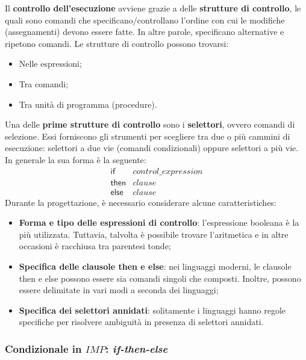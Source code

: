 \documentclass[a4paper]{article}
\begin{document}
 	Il \textbf{controllo dell'esecuzione} avviene grazie a delle \textbf{strutture di controllo}, le quali sono comandi che specificano/controllano l'ordine con cui le modifiche (assegnamenti) devono essere fatte. In altre parole, specificano alternative e ripetono comandi. Le strutture di controllo possono trovarsi:
 	\begin{itemize}
 		\item Nelle espressioni;
 		\item Tra comandi;
 		\item Tra unità di programma (procedure).
 	\end{itemize}
 	Una delle \textbf{prime strutture di controllo} sono i \textcolor{Red3}{\textbf{selettori}}, ovvero comandi di selezione. Essi forniscono gli strumenti per scegliere tra due o più cammini di esecuzione: selettori a due vie (comandi condizionali) oppure selettori a più vie. In generale la sua forma è la seguente:
 	\begin{equation*}
 		\begin{array}{ll}
 			\mathsf{if} 	& control\_expression \\
 			\mathsf{then}	& clause \\
 			\mathsf{else}	& clause
 		\end{array}
 	\end{equation*}
 	Durante la progettazione, è necessario considerare alcune caratteristiches:
 	\begin{itemize}
 		\item \textbf{Forma e tipo delle espressioni di controllo}: l'espressione booleana è la più utilizzata. Tuttavia, talvolta è possibile trovare l'aritmetica e in altre occasioni è racchiusa tra parentesi tonde;
 		
 		\item \textbf{Specifica delle clausole \textsf{then} e \textsf{else}}: nei linguaggi moderni, le clausole \textsf{then} e \textsf{else} possono essere sia comandi singoli che composti. Inoltre, possono essere delimitate in vari modi a seconda dei linguaggi;
 		
 		\item \textbf{Specifica dei selettori annidati}: solitamente i linguaggi hanno regole specifiche per risolvere ambiguità in presenza di selettori annidati.
 	\end{itemize}\newpage
 	
 	\subsubsection{Condizionale in $IMP$: \emph{if-then-else}}
 	
\end{document}

